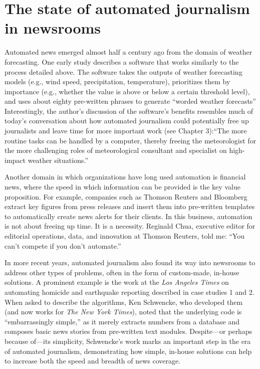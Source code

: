 \documentclass[notoc, symmetric, nobib, nols]{towcenter-book}
\begin{document}
\section{The state of automated journalism in newsrooms}

Automated news emerged almost half a century ago from the domain of weather forecasting. One early study describes a software that works similarly to the process detailed above. The software takes the outputs of weather forecasting models (e.g., wind speed, precipitation, temperature), prioritizes them by importance (e.g., whether the value is above or below a certain threshold level), and uses about eighty pre-written phrases to generate ``worded weather forecasts'' Interestingly, the author’s discussion of the software’s benefits resembles much of today’s conversation about how automated journalism could potentially free up journalists and leave time for more important work (see Chapter 3):``The more routine tasks can be handled by a computer, thereby freeing the meteorologist for the more challenging roles of meteorological consultant and specialist on high-impact weather situations.''\cite{glahn70}

Another domain in which organizations have long used automation is financial news, where the speed in which information can be provided is the key value proposition. For example, companies such as Thomson Reuters and Bloomberg extract key figures from press releases and insert them into pre-written templates to automatically create news alerts for their clients. In this business, automation is not about freeing up time. It is a necessity. Reginald Chua, executive editor for editorial operations, data, and innovation at Thomson Reuters, told me: ``You can’t compete if you don’t automate.''

In more recent years, automated journalism also found its way into newsrooms to address other types of problems, often in the form of custom-made, in-house solutions. A prominent example is the work at the \textit{Los Angeles Times} on automating homicide and earthquake reporting described in case studies 1 and 2. When asked to describe the algorithms, Ken Schwencke, who developed them (and now works for \textit{The New York Times}), noted that the underlying code is ``embarrassingly simple,'' as it merely extracts numbers from a database and composes basic news stories from pre-written text modules.\cite{young15} Despite---or perhaps because of---its simplicity, Schwencke’s work marks an important step in the era of automated journalism, demonstrating how simple, in-house solutions can help to increase both the speed and breadth of news coverage. 
\end{document}
